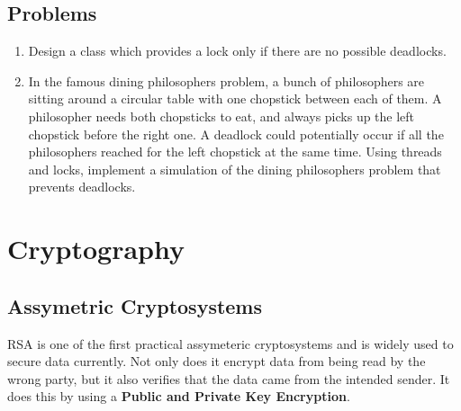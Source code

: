 \documentclass{article}
\begin{document}
	\subsection{Problems}
		\begin{enumerate}
			\item Design a class which provides a lock only if there are no possible deadlocks.
			\item In the famous dining philosophers problem, a bunch of philosophers are sitting around a circular table with one chopstick between each of them. A philosopher needs both chopsticks to eat, and always picks up the left chopstick before the right one. A deadlock could potentially occur if all the philosophers reached for the left chopstick at the same time. Using threads and locks, implement a simulation of the dining philosophers problem that prevents deadlocks.
		\end{enumerate}

\clearpage
\section{Cryptography}
	\subsection{Assymetric Cryptosystems}
		RSA is one of the first practical assymeteric cryptosystems and is widely used to secure data currently. Not only does it encrypt data from being read by the wrong party, but it also verifies that the data came from the intended sender. It does this by using a {\bf Public and Private Key Encryption}.
\end{document}

